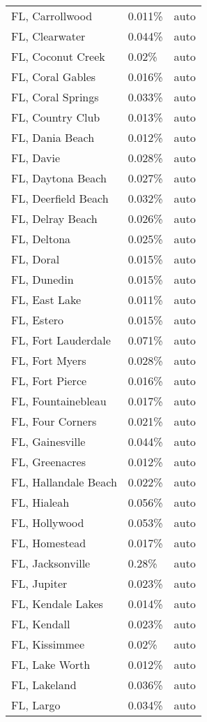 \begin{longtable}[]{@{}lll@{}}
FL, Carrollwood & 0.011\% & auto \\
FL, Clearwater & 0.044\% & auto \\
FL, Coconut Creek & 0.02\% & auto \\
FL, Coral Gables & 0.016\% & auto \\
FL, Coral Springs & 0.033\% & auto \\
FL, Country Club & 0.013\% & auto \\
FL, Dania Beach & 0.012\% & auto \\
FL, Davie & 0.028\% & auto \\
FL, Daytona Beach & 0.027\% & auto \\
FL, Deerfield Beach & 0.032\% & auto \\
FL, Delray Beach & 0.026\% & auto \\
FL, Deltona & 0.025\% & auto \\
FL, Doral & 0.015\% & auto \\
FL, Dunedin & 0.015\% & auto \\
FL, East Lake & 0.011\% & auto \\
FL, Estero & 0.015\% & auto \\
FL, Fort Lauderdale & 0.071\% & auto \\
FL, Fort Myers & 0.028\% & auto \\
FL, Fort Pierce & 0.016\% & auto \\
FL, Fountainebleau & 0.017\% & auto \\
FL, Four Corners & 0.021\% & auto \\
FL, Gainesville & 0.044\% & auto \\
FL, Greenacres & 0.012\% & auto \\
FL, Hallandale Beach & 0.022\% & auto \\
FL, Hialeah & 0.056\% & auto \\
FL, Hollywood & 0.053\% & auto \\
FL, Homestead & 0.017\% & auto \\
FL, Jacksonville & 0.28\% & auto \\
FL, Jupiter & 0.023\% & auto \\
FL, Kendale Lakes & 0.014\% & auto \\
FL, Kendall & 0.023\% & auto \\
FL, Kissimmee & 0.02\% & auto \\
FL, Lake Worth & 0.012\% & auto \\
FL, Lakeland & 0.036\% & auto \\
FL, Largo & 0.034\% & auto \\

\end{longtable}
